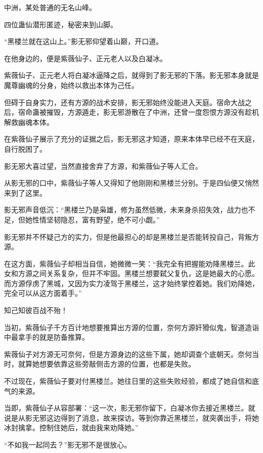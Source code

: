 
\begin{this_body}



中洲，某处普通的无名山峰。

四位蛊仙潜形匿迹，秘密来到山脚。

“黑楼兰就在这山上。”影无邪仰望着山巅，开口道。

在他身边的，便是紫薇仙子、正元老人以及白凝冰。

紫薇仙子、正元老人将白凝冰逼降之后，就得到了影无邪的下落。影无邪本身就是魔尊幽魂的分身，始终以救出本体为己任。

但碍于自身实力，还有方源的战术安排，影无邪始终没能进入天庭。宿命大战之后，宿命蛊被摧毁，方源遁走，影无邪游散在了中洲，还曾一度怨恨方源没有趁机解救幽魂本体。

在紫薇仙子展示了充分的证据之后，影无邪这才知道，原来本体早已经不在天庭，自行脱困了。

影无邪大喜过望，当然直接舍弃了方源，和紫薇仙子等人汇合。

从影无邪的口中，紫薇仙子等人又得知了他刚刚和黑楼兰分别。于是四仙便又悄然来到了这里。

影无邪声音低沉：“黑楼兰乃是枭雄，修为虽然低微，未来身杀招失效，战力也不足，但她性情坚韧隐忍，富有野望，绝不可小觑。”

影无邪并不怀疑己方的实力，但是他最担心的却是黑楼兰是否能转投自己，背叛方源。

在这方面，紫薇仙子却相当自信，她微微一笑：“我完全有把握能劝降黑楼兰。此女和方源之间关系复杂，但并不牢固。黑楼兰想要弑父复仇，这是她最大的心愿。而方源俘虏了黑城，又因为实力凌驾于黑楼兰，这才始终掌控着她。我们劝降她，完全可以从这方面着手。”

知己知彼百战不殆！

当初，紫薇仙子千方百计地想要推算出方源的位置，奈何方源奸猾似鬼，智道造诣中最拿手的就是防备推算。

紫薇仙子对方源无可奈何，但是方源身边的这些下属，她却调查个底朝天。奈何当时，就算她想要依靠这些旁敲侧击方源的位置，也都是失败。

不过现在，紫薇仙子要对付黑楼兰。她往日里的这些失败经验，都成了她自信和底气的来源。

当即，紫薇仙子从容部署：“这一次，影无邪你留下，白凝冰你去接近黑楼兰。就说是从影无邪这边得到了消息，故来探访。等到你靠近黑楼兰，就突袭出手，将她冰封擒拿。控制住她后，就由我来劝降她。”

“不如我一起同去？”影无邪不是很放心。


\end{this_body}
